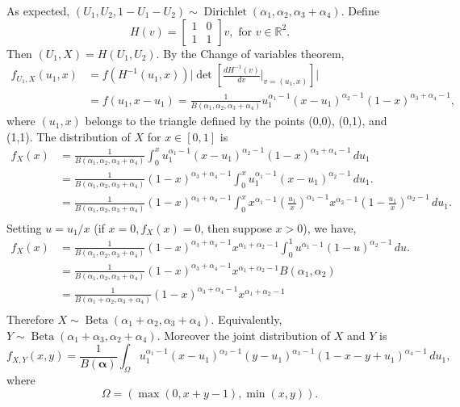 \documentclass[a4paper, notitlepage, 11pt]{article}
\newcommand{\R}{\mathbb{R}}
\newcommand{\betadist}{\operatorname{Beta}}
\theoremstyle{definition}
\theoremstyle{remark}
\begin{document}
As expected, $(U_1, U_2, 1-U_1-U_2) \sim
\operatorname{Dirichlet}(\alpha_1,\alpha_2,\alpha_3+\alpha_4)$. Define 
$$
H(v) = \begin{bmatrix}
  1 & 0 \\ 1 & 1
\end{bmatrix}v, \text{ for } v \in \R^2.
$$
Then $(U_1, X) = H(U_1, U_2)$. By the Change of variables theorem, 
\begin{equation}
  \begin{split}
    f_{U_1, X}(u_1, x) &= f({H^{-1}(u_1,x)})\bigg|\det\left[\frac{dH^{-1}(v)}{dv}\bigg|_{v=(u_1,x)}\right]\bigg| \\ 
    &= f(u_1, x - u_1) = \frac{1}{B(\alpha_1, \alpha_2, \alpha_3+\alpha_4)}u_1^{\alpha_1-1}(x-u_1)^{\alpha_2-1}(1-x)^{\alpha_3+\alpha_4-1}, 
  \end{split}
\end{equation}
where $(u_1, x)$ belongs to the triangle defined by the points (0,0),
(0,1), and (1,1). The distribution of $X$ for $x \in [0,1]$ is
\begin{equation}
  \begin{split}
    f_X(x) &= \frac{1}{B(\alpha_1, \alpha_2, \alpha_3+\alpha_4)}\int_{0}^{x} u_1^{\alpha_1-1}(x-u_1)^{\alpha_2-1}(1-x)^{\alpha_3+\alpha_4-1} \, du_1 \\
    &= \frac{1}{B(\alpha_1, \alpha_2, \alpha_3+\alpha_4)}(1-x)^{\alpha_3+\alpha_4-1} \int_{0}^{x} u_1^{\alpha_1-1}(x-u_1)^{\alpha_2-1} \, du_1. \\
    &= \frac{1}{B(\alpha_1, \alpha_2, \alpha_3+\alpha_4)}(1-x)^{\alpha_3+\alpha_4-1} \int_{0}^{x} x^{\alpha_1-1} \left(\frac{u_1}{x}\right)^{\alpha_1-1}x^{\alpha_2 - 1}\left(1-\frac{u_1}{x}\right)^{\alpha_2-1} \, du_1. \\
  \end{split}
\end{equation}
Setting $u = u_1/x$ (if $x = 0, f_X(x) = 0$, then suppose $x > 0$), we have, 
\begin{equation}
  \begin{split}
    f_X(x) &= \frac{1}{B(\alpha_1, \alpha_2, \alpha_3+\alpha_4)}(1-x)^{\alpha_3+\alpha_4-1} x^{\alpha_1+\alpha_2-1} \int_{0}^{1} u^{\alpha_1-1}(1-u)^{\alpha_2-1} \, du. \\
    &= \frac{1}{B(\alpha_1, \alpha_2, \alpha_3+\alpha_4)}(1-x)^{\alpha_3+\alpha_4-1} x^{\alpha_1+\alpha_2-1} B(\alpha_1, \alpha_2)\\
    &= \frac{1}{B(\alpha_1 + \alpha_2, \alpha_3+\alpha_4)}(1-x)^{\alpha_3+\alpha_4-1} x^{\alpha_1+\alpha_2-1}\\
  \end{split}
\end{equation}
Therefore $X \sim \betadist(\alpha_1+\alpha_2, \alpha_3+\alpha_4)$.
Equivalently, $Y \sim \betadist(\alpha_1+\alpha_3, \alpha_2 + \alpha_4)$.
Moreover the joint distribution of $X$ and $Y$ is 
\begin{equation}
  f_{X,Y}(x,y) = \frac{1}{B(\boldsymbol{\alpha})}\int_{\Omega} u_1^{\alpha_1 - 1}(x - u_1)^{\alpha_2 -1}(y-u_1)^{\alpha_3-1}(1-x-y+u_1)^{\alpha_4-1} \, du_1,
\end{equation}
where 
$$
\Omega = (\max(0, x+y-1), \min(x,y)).
$$
\end{document}
